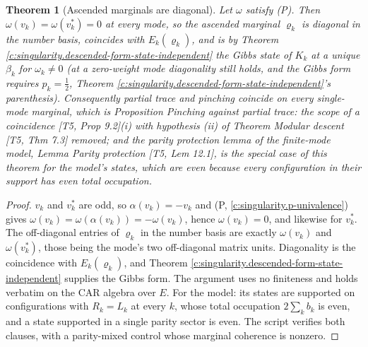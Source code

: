 \documentclass[11pt]{article}
\newtheorem{theorem}{Theorem}[section]
\theoremstyle{definition}
\theoremstyle{plain}
\begin{document}
\begin{theorem}[Ascended marginals are diagonal]\label{c:singularity.ascended-marginals-are-diagonal}
Let $\omega$ satisfy (P). Then $\omega(v_k) = \omega(v_k^{*}) = 0$ at every mode, so the ascended marginal $\varrho_k$ is diagonal in the number basis, coincides with $E_k(\varrho_k)$, and is by Theorem \ref{c:singularity.descended-form-state-independent} the Gibbs state of $K_k$ at a unique $\beta_k$ for $\omega_k \neq 0$ (at a zero-weight mode diagonality still holds, and the Gibbs form requires $p_k = \tfrac12$, Theorem \ref{c:singularity.descended-form-state-independent}'s parenthesis). Consequently partial trace and pinching coincide on every single-mode marginal, which is Proposition \emph{Pinching against partial trace: the scope of a coincidence} [T5, Prop 9.2](i) with hypothesis (ii) of Theorem \emph{Modular descent} [T5, Thm 7.3] removed; and the parity protection lemma of the finite-mode model, Lemma \emph{Parity protection} [T5, Lem 12.1], is the special case of this theorem for the model's states, which are even because every configuration in their support has even total occupation.
\end{theorem}
\begin{proof}
$v_k$ and $v_k^{*}$ are odd, so $\alpha(v_k) = -v_k$ and (P, \ref{c:singularity.p-univalence}) gives $\omega(v_k) = \omega(\alpha(v_k)) = -\omega(v_k)$, hence $\omega(v_k) = 0$, and likewise for $v_k^{*}$. The off-diagonal entries of $\varrho_k$ in the number basis are exactly $\omega(v_k)$ and $\omega(v_k^{*})$, those being the mode's two off-diagonal matrix units. Diagonality is the coincidence with $E_k(\varrho_k)$, and Theorem \ref{c:singularity.descended-form-state-independent} supplies the Gibbs form. The argument uses no finiteness and holds verbatim on the CAR algebra over $E$. For the model: its states are supported on configurations with $R_k = L_k$ at every $k$, whose total occupation $2\sum_k b_k$ is even, and a state supported in a single parity sector is even. The script verifies both clauses, with a parity-mixed control whose marginal coherence is nonzero.

\end{proof}
\end{document}
